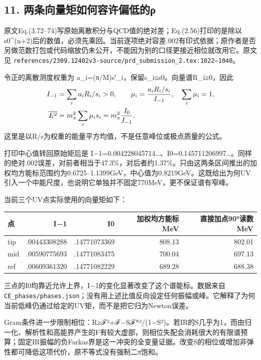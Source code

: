 \documentclass[
  11pt,
  a4paper,
]{article}
\newcounter{none} %
\begin{document}
\subsection{11.
两条向量矩如何容许偏低的ρ}\label{ux4e24ux6761ux5411ux91cfux77e9ux5982ux4f55ux5bb9ux8bb8ux504fux4f4eux7684ux3c1}

原文Eq.(3.72--74)写原始离散积分与QCD值的绝对差；Eq.(2.56)打印的是除以s0\^{}(n+2)后的数值，必须先乘回。当前逐项绝对容差.002有印式依据；原作者是否另做范数打包或代码缩放仍未公开，不能因为别的口径更接近相位就改用它。原文见
\texttt{references/2309.12402v3-source/prd\_submission\_2.tex:1022–1040}。

令正的离散测度权重为 a\_i=(π/M)s′\_i，保留s\_i≤s0。向量谱R\_i≥0，因此 \[
\begin{aligned}
I_{-1}&=\sum_i a_iR_i/s_i>0,\qquad
\mu_i={a_iR_i/s_i\over I_{-1}},\quad\sum_i\mu_i=1,\\
\overline{E^2}&=m_\pi^2\sum_i\mu_i s_i=m_\pi^2{I_0\over I_{-1}}.
\end{aligned}
\] 这里是以R/s为权重的能量平方均值，不是任意峰位或极点质量的公式。

打印中心值转回原始矩后是
I−1=0.004228045714\ldots、I0=0.145711206997\ldots。同样的绝对.002误差，对前者相当于47.3\%，对后者约1.37\%。只由这两条区间推出的加权均方能标范围约为0.6725--1.1399GeV，中心值为0.8219GeV。这既给出为何UV引入一个中能尺度，也说明它单独并不固定770MeV，更不保证谱有窄峰。

当前三个UV点实际使用的向量矩如下：

{\def\LTcaptype{none} %
\begin{longtable}[]{@{}lrrrr@{}}
\toprule\noalign{}
点 & I−1 & I0 & 加权均方能标 MeV & 直接加点90°读数 MeV \\
\midrule\noalign{}
\endhead
\bottomrule\noalign{}
\endlastfoot
tip & .00443308288 & .14771073369 & 808.13 & 802.01 \\
mid & .00590775693 & .14771083475 & 700.04 & 697.13 \\
ref & .00609361320 & .14771082229 & 689.28 & 688.38 \\
\end{longtable}
}

三点的I0均靠近允许上界，I−1的变化显著改变了这个谱能标。数据来自
\texttt{CE\_phases/phases.json}；没有用上述比值反向设定任何振幅或峰。它解释了为何当前低峰仍通过给定的UV矩，而不是把它归为Newton误差。

Gram条件进一步限制相位：R≥\textbar ℱ\textbar²+\textbar ℱ−Sℱ*\textbar²/(1−\textbar S\textbar²)。若IR的S几乎为1，而由归一化、解析性和高能界产生的F有较大虚部，则相位失配会消耗很大的有限谱预算；固定IR振幅的负Farkas界是这一冲突的全变量证据。改变S的相位或增加非弹性都可降低这项代价，原不等式没有强制二π饱和。
\end{document}
